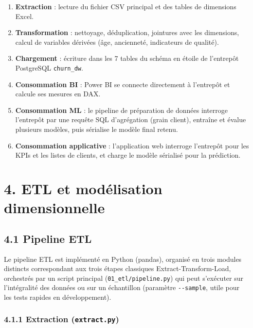 \documentclass[11pt,a4paper]{article}
\providecommand{\tightlist}{\setlength{\itemsep}{0pt}\setlength{\parskip}{0pt}}
\begin{document}
\begin{enumerate}
\def\labelenumi{\arabic{enumi}.}
\tightlist
\item
  \textbf{Extraction} : lecture du fichier CSV principal et des tables
  de dimensions Excel.
\item
  \textbf{Transformation} : nettoyage, déduplication, jointures avec les
  dimensions, calcul de variables dérivées (âge, ancienneté, indicateurs
  de qualité).
\item
  \textbf{Chargement} : écriture dans les 7 tables du schéma en étoile
  de l'entrepôt PostgreSQL \texttt{churn\_\hspace{0pt}dw}.
\item
  \textbf{Consommation BI} : Power BI se connecte directement à
  l'entrepôt et calcule ses mesures en DAX.
\item
  \textbf{Consommation ML} : le pipeline de préparation de données
  interroge l'entrepôt par une requête SQL d'agrégation (grain client),
  entraîne et évalue plusieurs modèles, puis sérialise le modèle final
  retenu.
\item
  \textbf{Consommation applicative} : l'application web interroge
  l'entrepôt pour les KPIs et les listes de clients, et charge le modèle
  sérialisé pour la prédiction.
\end{enumerate}

\newpage

\hypertarget{etl-et-moduxe9lisation-dimensionnelle}{%
\section{4. ETL et modélisation
dimensionnelle}\label{etl-et-moduxe9lisation-dimensionnelle}}

\hypertarget{pipeline-etl}{%
\subsection{4.1 Pipeline ETL}\label{pipeline-etl}}

Le pipeline ETL est implémenté en Python (pandas), organisé en trois
modules distincts correspondant aux trois étapes classiques
Extract-Transform-Load, orchestrés par un script principal
(\texttt{01\_\hspace{0pt}etl/\hspace{0pt}pipeline.py}) qui peut
s'exécuter sur l'intégralité des données ou sur un échantillon
(paramètre \texttt{-\/-sample}, utile pour les tests rapides en
développement).

\hypertarget{extraction-extract.py}{%
\subsubsection{\texorpdfstring{4.1.1 Extraction
(\texttt{extract.py})}{4.1.1 Extraction (extract.py)}}\label{extraction-extract.py}}
\end{document}
